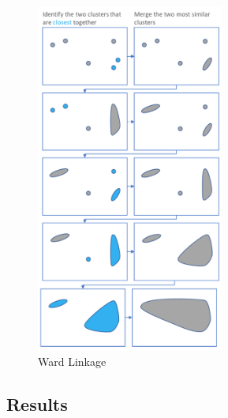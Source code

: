 \documentclass[a4paper, 12pt]{article}
\begin{document}
\begin{figure}
    \centering
    \includegraphics[width=0.55\textwidth]{Ward Linkage.png}
    \caption{Ward Linkage \citep{hierarchicaltutorial2017}}
\end{figure}

\subsection{Results}


\end{document}
